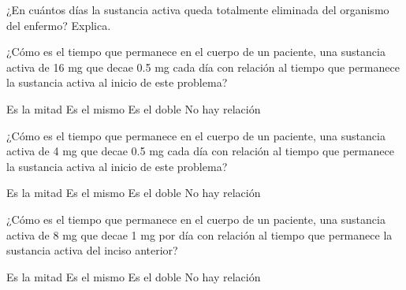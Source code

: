 \begin{parts}
    \begin{solutionbox}{2cm}

    \end{solutionbox}

    ¿En cuántos días la sustancia activa queda totalmente eliminada del organismo del enfermo? Explica.

    \begin{solutionbox}{2cm}

    \end{solutionbox}

    \newpage

    ¿Cómo es el tiempo que permanece en el cuerpo de un paciente, una sustancia activa
    de 16 mg que decae 0.5 mg cada día con relación al tiempo que permanece la sustancia activa al inicio de este problema?

    \begin{oneparchoices}
        \choice Es la mitad
        \choice Es el mismo
        \CorrectChoice Es el doble
        \choice No hay relación
    \end{oneparchoices}

    ¿Cómo es el tiempo que permanece en el cuerpo de un paciente, una sustancia activa de 4 mg que decae
    0.5 mg cada día con relación al tiempo que permanece la sustancia activa al inicio de este problema?

    \begin{oneparchoices}
        \CorrectChoice Es la mitad
        \choice Es el mismo
        \choice Es el doble
        \choice No hay relación
    \end{oneparchoices}

    ¿Cómo es el tiempo que permanece en el cuerpo de un paciente, una sustancia activa de 8 mg que decae 1 mg
    por día con relación al tiempo que permanece la sustancia activa del inciso anterior?

    \begin{oneparchoices}
        \choice Es la mitad
        \CorrectChoice Es el mismo
        \choice Es el doble
        \choice No hay relación
    \end{oneparchoices}




\end{parts}
